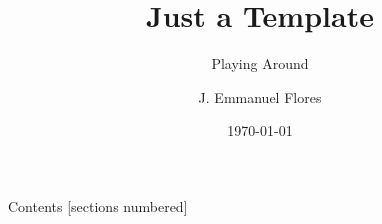 \documentclass[12pt]{beamer}
\title{Just a Template}
\subtitle{Playing Around}
\date{\today}
\author{J. Emmanuel Flores}
\institute{Tufts University}
\begin{document}
\maketitle


\begin{frame}{Contents}
[sections numbered]
\tableofcontents

\end{frame}
\end{document}
